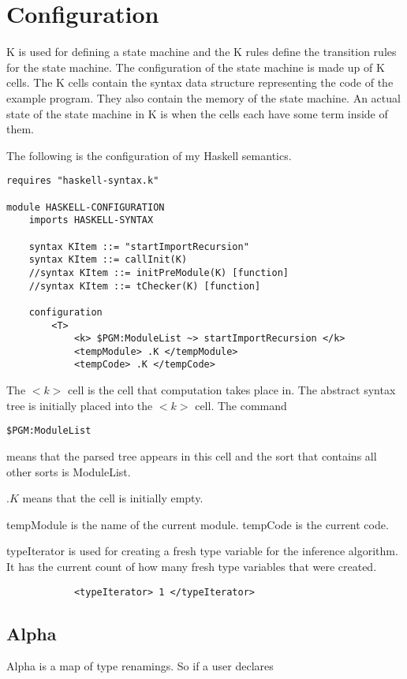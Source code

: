 \chapter{Configuration}
K is used for defining a state machine and the K rules define the transition rules for the state machine. The configuration of the state machine is made up of K cells. The K cells contain the syntax data structure representing the code of the example program. They also contain the memory of the state machine. An actual state of the state machine in K is when the cells each have some term inside of them.

The following is the configuration of my Haskell semantics.
\begin{lstlisting}
requires "haskell-syntax.k"

module HASKELL-CONFIGURATION
    imports HASKELL-SYNTAX

    syntax KItem ::= "startImportRecursion"
    syntax KItem ::= callInit(K)
    //syntax KItem ::= initPreModule(K) [function]
    //syntax KItem ::= tChecker(K) [function]

    configuration 
        <T>
            <k> $PGM:ModuleList ~> startImportRecursion </k>
            <tempModule> .K </tempModule>
            <tempCode> .K </tempCode>
\end{lstlisting}

The $<k>$ cell is the cell that computation takes place in.
The abstract syntax tree is initially placed into the $<k>$ cell.
The command
\begin{lstlisting}
$PGM:ModuleList
\end{lstlisting}
means that the parsed tree appears in this cell and the sort that contains all other sorts is ModuleList.

$.K$ means that the cell is initially empty.

tempModule is the name of the current module. tempCode is the current code.

typeIterator is used for creating a fresh type variable for the inference algorithm. It has the current count of how many fresh type variables that were created.

\begin{lstlisting}
            <typeIterator> 1 </typeIterator>
\end{lstlisting}

\section{Alpha}
Alpha is a map of type renamings. So if a user declares

